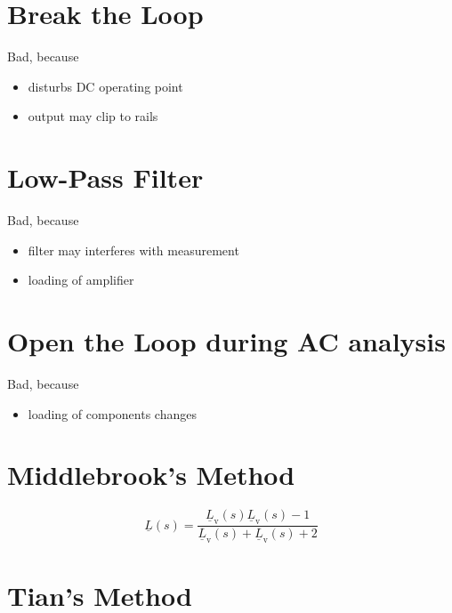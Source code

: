 \documentclass{article}[11pt]
\begin{document}
\notetitle

\cite{kundert-spicespectre-95}

\section{Break the Loop}
Bad, because
\begin{itemize}
  \item disturbs DC operating point
  \item output may clip to rails
\end{itemize}

\section{Low-Pass Filter}

Bad, because
\begin{itemize}
  \item filter may interferes with measurement
  \item loading of amplifier
\end{itemize}

\section{Open the Loop during AC analysis}

Bad, because
\begin{itemize}
  \item loading of components changes
\end{itemize}

\section{Middlebrook's Method}

\begin{equation}
\underline{L}(s) = \frac{\underline{L}_{\mathrm{v}}(s) \underline{L}_{\mathrm{v}}(s) -1}{\underline{L}_{\mathrm{v}}(s) + \underline{L}_{\mathrm{v}}(s) + 2}
\end{equation}
\cite{middlebrook-measloopgain-75}

\section{Tian's Method}
\cite{tian-stricsmalsigstab-01}


\cite{meag-compstab-15}


\printbibliography
\end{document}
